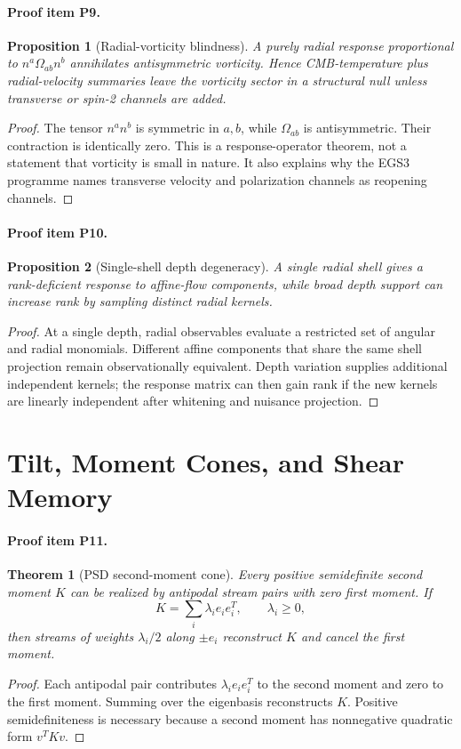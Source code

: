 \documentclass[11pt]{article}
\newtheorem{proposition}{Proposition}
\newtheorem{theorem}{Theorem}
\begin{document}
\paragraph{Proof item P9.}
\begin{proposition}[Radial-vorticity blindness]
A purely radial response proportional to \(n^a\Omega_{ab}n^b\) annihilates antisymmetric vorticity.  Hence CMB-temperature plus radial-velocity summaries leave the vorticity sector in a structural null unless transverse or spin-2 channels are added.
\end{proposition}
\begin{proof}
The tensor \(n^an^b\) is symmetric in \(a,b\), while \(\Omega_{ab}\) is antisymmetric.  Their contraction is identically zero.  This is a response-operator theorem, not a statement that vorticity is small in nature.  It also explains why the EGS3 programme names transverse velocity and polarization channels as reopening channels.
\end{proof}

\paragraph{Proof item P10.}
\begin{proposition}[Single-shell depth degeneracy]
A single radial shell gives a rank-deficient response to affine-flow components, while broad depth support can increase rank by sampling distinct radial kernels.
\end{proposition}
\begin{proof}
At a single depth, radial observables evaluate a restricted set of angular and radial monomials.  Different affine components that share the same shell projection remain observationally equivalent.  Depth variation supplies additional independent kernels; the response matrix can then gain rank if the new kernels are linearly independent after whitening and nuisance projection.
\end{proof}

\section{Tilt, Moment Cones, and Shear Memory}
\paragraph{Proof item P11.}
\begin{theorem}[PSD second-moment cone]
Every positive semidefinite second moment \(K\) can be realized by antipodal stream pairs with zero first moment.  If
\[
  K=\sum_i\lambda_i e_i e_i^T,\qquad \lambda_i\ge0,
\]
then streams of weights \(\lambda_i/2\) along \(\pm e_i\) reconstruct \(K\) and cancel the first moment.
\end{theorem}
\begin{proof}
Each antipodal pair contributes \(\lambda_i e_i e_i^T\) to the second moment and zero to the first moment.  Summing over the eigenbasis reconstructs \(K\).  Positive semidefiniteness is necessary because a second moment has nonnegative quadratic form \(v^T K v\).
\end{proof}
\end{document}
